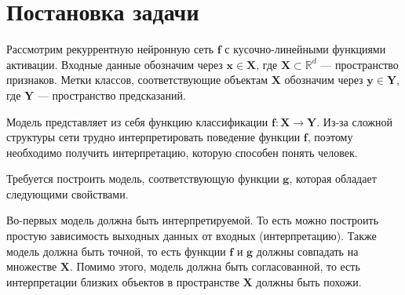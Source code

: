 \documentclass[a4paper, 12pt]{article}
\begin{document}
\section{Постановка задачи}
Рассмотрим рекуррентную нейронную сеть $\mathbf{f}$ с кусочно-линейными функциями активации. Входные данные обозначим через $\mathbf{x} \in \mathbf{X}$, где $\mathbf{X} \subset \mathbb{R}^d$ --- пространство признаков. Метки классов, соответствующие объектам $\mathbf{X}$ обозначим через $\mathbf{y} \in \mathbf{Y}$, где $\mathbf{Y}$ --- пространство предсказаний.

Модель представляет из себя функцию классификации $\mathbf{f}: \mathbf{X} \to \mathbf{Y}$. Из-за сложной структуры сети трудно интерпретировать поведение функции $\mathbf{f}$, поэтому необходимо получить интерпретацию, которую способен понять человек.

Требуется построить модель, соответствующую функции $\mathbf{g}$, которая обладает следующими свойствами.

Во-первых модель должна быть интерпретируемой. То есть можно построить простую зависимость выходных данных от входных (интерпретацию). Также модель должна быть точной, то есть функции $\mathbf{f}$ и $\mathbf{g}$ должны совпадать на множестве $\mathbf{X}$. Помимо этого, модель должна быть согласованной, то есть интерпретации близких объектов в пространстве $\mathbf{X}$ должны быть похожи.
\end{document}
